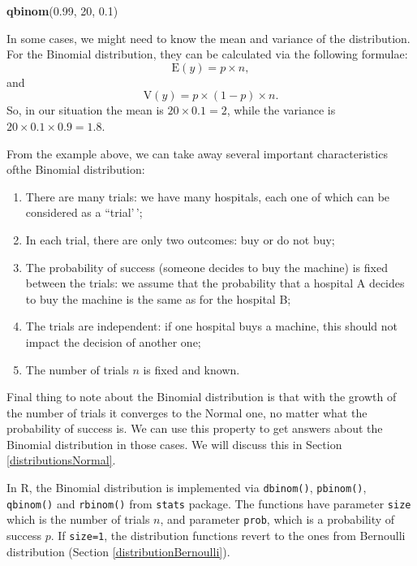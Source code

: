 \documentclass[
]{book}
\newenvironment{Shaded}{\begin{snugshade}}{\end{snugshade}}
\newcommand{\DecValTok}[1]{\textcolor[rgb]{0.00,0.00,0.81}{#1}}
\newcommand{\FloatTok}[1]{\textcolor[rgb]{0.00,0.00,0.81}{#1}}
\newcommand{\KeywordTok}[1]{\textcolor[rgb]{0.13,0.29,0.53}{\textbf{#1}}}
\newcommand{\NormalTok}[1]{#1}
\providecommand{\tightlist}{%
  \setlength{\itemsep}{0pt}\setlength{\parskip}{0pt}}
\theoremstyle{definition}
\theoremstyle{definition}
\theoremstyle{definition}
\theoremstyle{definition}
\theoremstyle{remark}
\begin{document}
\begin{Shaded}
\begin{Highlighting}[]
\KeywordTok{qbinom}\NormalTok{(}\FloatTok{0.99}\NormalTok{, }\DecValTok{20}\NormalTok{, }\FloatTok{0.1}\NormalTok{)}
\end{Highlighting}
\end{Shaded}

In some cases, we might need to know the mean and variance of the distribution. For the Binomial distribution, they can be calculated via the following formulae:
\begin{equation}
    \mathrm{E}(y) = p \times n ,
    \label{eq:BinomialMean}
\end{equation}
and
\begin{equation}
    \mathrm{V}(y) = p \times (1-p) \times n .
    \label{eq:BinomialVariance}
\end{equation}
So, in our situation the mean is \(20 \times 0.1 = 2\), while the variance is \(20 \times 0.1 \times 0.9 = 1.8\).

From the example above, we can take away several important characteristics ofthe Binomial distribution:

\begin{enumerate}
\def\labelenumi{\arabic{enumi}.}
\tightlist
\item
  There are many trials: we have many hospitals, each one of which can be considered as a ``trial'\,';
\item
  In each trial, there are only two outcomes: buy or do not buy;
\item
  The probability of success (someone decides to buy the machine) is fixed between the trials: we assume that the probability that a hospital A decides to buy the machine is the same as for the hospital B;
\item
  The trials are independent: if one hospital buys a machine, this should not impact the decision of another one;
\item
  The number of trials \(n\) is fixed and known.
\end{enumerate}

Final thing to note about the Binomial distribution is that with the growth of the number of trials it converges to the Normal one, no matter what the probability of success is. We can use this property to get answers about the Binomial distribution in those cases. We will discuss this in Section \ref{distributionsNormal}.

In R, the Binomial distribution is implemented via \texttt{dbinom()}, \texttt{pbinom()}, \texttt{qbinom()} and \texttt{rbinom()} from \texttt{stats} package. The functions have parameter \texttt{size} which is the number of trials \(n\), and parameter \texttt{prob}, which is a probability of success \(p\). If \texttt{size=1}, the distribution functions revert to the ones from Bernoulli distribution (Section \ref{distributionBernoulli}).
\end{document}
